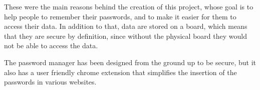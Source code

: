 These were the main reasons behind the creation of this project, whose goal is to help people to remember their passwords, and to make it easier for them to access their data. In addition to that, data are stored on a board, which means that they are secure by definition, since without the physical board they would not be able to access the data. 

The password manager has been designed from the ground up to be secure, but it also has a user friendly chrome extension that simplifies the insertion of the passwords in various websites.
